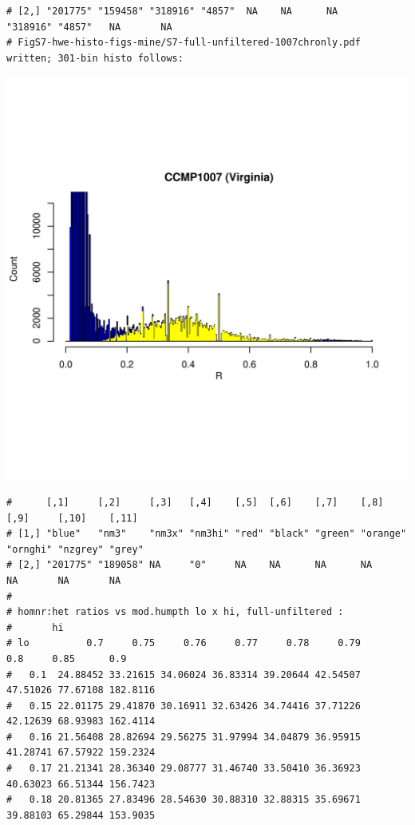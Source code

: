 \documentclass{article}\usepackage[]{graphicx}\usepackage[]{color}
\makeatletter
\def\maxwidth{ %
  \ifdim\Gin@nat@width>\linewidth
    \linewidth
  \else
    \Gin@nat@width
  \fi
}
\newenvironment{kframe}{%
 \def\at@end@of@kframe{}%
 \ifinner\ifhmode%
  \def\at@end@of@kframe{\end{minipage}}%
  \begin{minipage}{\columnwidth}%
 \fi\fi%
 \def\FrameCommand##1{\hskip\@totalleftmargin \hskip-\fboxsep
 \colorbox{shadecolor}{##1}\hskip-\fboxsep
     \hskip-\linewidth \hskip-\@totalleftmargin \hskip\columnwidth}%
 \MakeFramed {\advance\hsize-\width
   \@totalleftmargin\z@ \linewidth\hsize
   \@setminipage}}%
 {\par\unskip\endMakeFramed%
 \at@end@of@kframe}
\newenvironment{knitrout}{}{} %
\makeatother
\begin{document}
\begin{knitrout}
\begin{kframe}
\begin{verbatim}
# [2,] "201775" "159458" "318916" "4857"  NA    NA      NA      "318916" "4857"   NA       NA    
# FigS7-hwe-histo-figs-mine/S7-full-unfiltered-1007chronly.pdf written; 301-bin histo follows:
\end{verbatim}
\end{kframe}
\includegraphics[width=\maxwidth]{FigS7-hwe-histo-figs-knitr/unnamed-chunk-10-1} 
\begin{kframe}\begin{verbatim}
#      [,1]     [,2]     [,3]   [,4]    [,5]  [,6]    [,7]    [,8]     [,9]     [,10]    [,11] 
# [1,] "blue"   "nm3"    "nm3x" "nm3hi" "red" "black" "green" "orange" "ornghi" "nzgrey" "grey"
# [2,] "201775" "189058" NA     "0"     NA    NA      NA      NA       NA       NA       NA
# 
# homnr:het ratios vs mod.humpth lo x hi, full-unfiltered :
#       hi
# lo          0.7     0.75     0.76     0.77     0.78     0.79      0.8     0.85      0.9
#   0.1  24.88452 33.21615 34.06024 36.83314 39.20644 42.54507 47.51026 77.67108 182.8116
#   0.15 22.01175 29.41870 30.16911 32.63426 34.74416 37.71226 42.12639 68.93983 162.4114
#   0.16 21.56408 28.82694 29.56275 31.97994 34.04879 36.95915 41.28741 67.57922 159.2324
#   0.17 21.21341 28.36340 29.08777 31.46740 33.50410 36.36923 40.63023 66.51344 156.7423
#   0.18 20.81365 27.83496 28.54630 30.88310 32.88315 35.69671 39.88103 65.29844 153.9035

\end{verbatim}
\end{kframe}
\end{knitrout}
\end{document}
